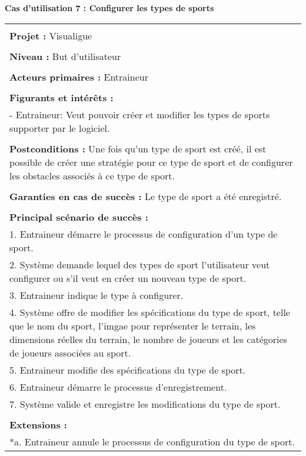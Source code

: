 \newpage
\begin{flushleft}
	\textbf{Cas d'utilisation 7 : Configurer les types de sports}\\
\end{flushleft}
\begin{tabular}{|p{16cm}|}
	\hline
	\\
	\textbf{Projet :} Visualigue\\
	\\
	\textbf{Niveau :} But d'utilisateur\\
	\\
	\textbf{Acteurs primaires :} Entraineur\\
	\\
	\textbf{Figurants et intérêts :} \\
	- Entraineur: Veut pouvoir créer et modifier les types de sports supporter par le logiciel.\\
	\\
	\textbf{Postconditions :} Une fois qu'un type de sport est créé, il est possible de créer une stratégie pour ce type de sport et de configurer les obstacles associés à ce type de sport.\\
	\\
	\textbf{Garanties en cas de succès :} Le type de sport a été enregistré.\\
	\\
	\textbf{Principal scénario de succès :}\\
	1. Entraineur démarre le processus de configuration d'un  type de sport.\\
	2. Système demande lequel des types de sport l'utilisateur veut configurer ou s'il veut en créer un nouveau type de sport.\\
	3. Entraineur indique le type à configurer.\\
	4. Système offre de modifier les spécifications du type de sport, telle que le nom du sport, l'imgae pour représenter le terrain, les dimensions réelles du terrain, le nombre de joueurs et les catégories de joueurs associées au sport.\\
	5. Entraineur modifie des spécifications du type de sport.\\
	6. Entraineur démarre le processus d'enregistrement.\\
	7. Système valide et enregistre les modifications du type de sport.\\
	\\
	\textbf{Extensions :}\\
	*a. Entraineur annule le processus de configuration du type de sport.\\

\end{tabular}
